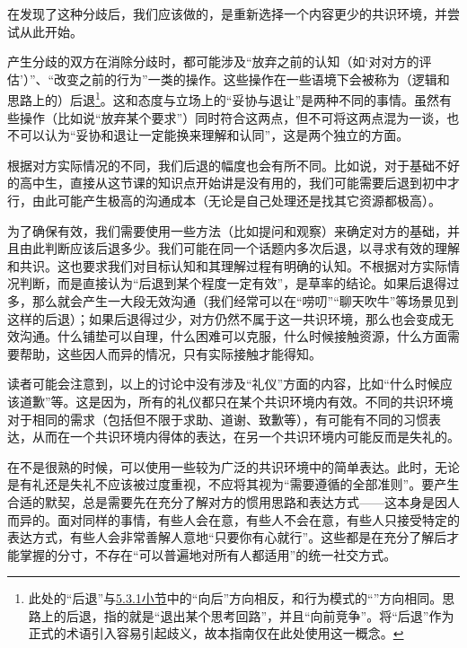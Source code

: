 在发现了这种分歧后，我们应该做的，是重新选择一个内容更少的共识环境，并尝试从此开始。
\begin{explain}
产生分歧的双方在消除分歧时，都可能涉及“放弃之前的认知（如‘对对方的评估’）”、“改变之前的行为”一类的操作。这些操作在一些语境下会被称为（逻辑和思路上的）后退\footnote{此处的“后退”与\hyperref[sec:向前竞争与向后竞争]{5.3.1小节}中的“向后”方向相反，和行为模式的“”方向相同。思路上的后退，指的就是“退出某个思考回路”，并且“向前竞争”。将“后退”作为正式的术语引入容易引起歧义，故本指南仅在此处使用这一概念。}。这和态度与立场上的“妥协与退让”是两种不同的事情。虽然有些操作（比如说“放弃某个要求”）同时符合这两点，但不可将这两点混为一谈，也不可以认为“妥协和退让一定能换来理解和认同”，这是两个独立的方面。

根据对方实际情况的不同，我们后退的幅度也会有所不同。比如说，对于基础不好的高中生，直接从这节课的知识点开始讲是没有用的，我们可能需要后退到初中才行，由此可能产生极高的沟通成本（无论是自己处理还是找其它资源都极高）。

为了确保有效，我们需要使用一些方法（比如提问和观察）来确定对方的基础，并且由此判断应该后退多少。我们可能在同一个话题内多次后退，以寻求有效的理解和共识。这也要求我们对目标认知和其理解过程有明确的认知。不根据对方实际情况判断，而是直接认为“后退到某个程度一定有效”，是草率的结论。如果后退得过多，那么就会产生一大段无效沟通（我们经常可以在“唠叨”“聊天吹牛”等场景见到这样的后退）；如果后退得过少，对方仍然不属于这一共识环境，那么也会变成无效沟通。什么铺垫可以自理，什么困难可以克服，什么时候接触资源，什么方面需要帮助，这些因人而异的情况，只有实际接触才能得知。
\end{explain}

\divider

读者可能会注意到，以上的讨论中没有涉及“礼仪”方面的内容，比如“什么时候应该道歉”等。这是因为，所有的礼仪都只在某个共识环境内有效。不同的共识环境对于相同的需求（包括但不限于求助、道谢、致歉等），有可能有不同的习惯表达，从而在一个共识环境内得体的表达，在另一个共识环境内可能反而是失礼的。

在不是很熟的时候，可以使用一些较为广泛的共识环境中的简单表达。此时，无论是有礼还是失礼不应该被过度重视，不应将其视为“需要遵循的全部准则”。要产生合适的默契，总是需要先在充分了解对方的惯用思路和表达方式——这本身是因人而异的。面对同样的事情，有些人会在意，有些人不会在意，有些人只接受特定的表达方式，有些人会非常善解人意地“只要你有心就行”。这些都是在充分了解后才能掌握的分寸，不存在“可以普遍地对所有人都适用”的统一社交方式。